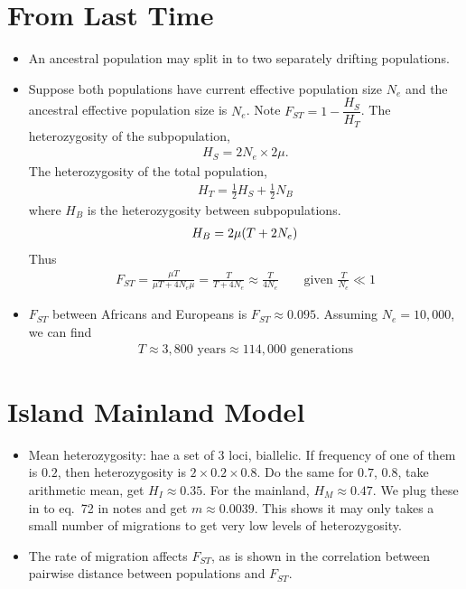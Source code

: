 \documentclass{article}
\begin{document}
    \section{From Last Time}
        \begin{itemize}
            \item An ancestral population may split in to two separately drifting populations.
            \item Suppose both populations have current effective population size $N_e$ and the ancestral effective population size is $N_e$.  Note $F_{ST} = 1 - \dfrac{H_S}{H_T}$.  The heterozygosity of the subpopulation,
            \begin{align}
                H_S = 2N_e\times2\mu.
            \end{align}
            The heterozygosity of the total population,
            \begin{align}
                H_T = \frac{1}{2}H_S + \frac{1}{2}N_B
            \end{align}
            where $H_B$ is the heterozygosity between subpopulations.
            \begin{align}
                H_B = 2\mu\qty(T + 2N_e)
            \end{align}
            Thus
            \begin{align}
                F_{ST} = \frac{\mu T}{\mu T + 4N_e\mu} = \frac{T}{T + 4N_e}\approx \frac{T}{4N_e} \qquad \text{given }\frac{T}{N_e} \ll 1
            \end{align}
            \item $F_{ST}$ between Africans and Europeans is $F_{ST} \approx 0.095$.  Assuming $N_e = 10,000$, we can find
            \begin{align}
                T \approx 3,800 \text{ years} \approx 114,000 \text{ generations}
            \end{align}
        \end{itemize}

    \section{Island Mainland Model}
        \begin{itemize}
            \item Mean heterozygosity: hae a set of 3 loci, biallelic.  If frequency of one of them is $0.2$, then heterozygosity is $2\times0.2\times0.8$.  Do the same for $0.7$, $0.8$, take arithmetic mean, get $H_I \approx 0.35$.  For the mainland, $H_M \approx 0.47$.  We plug these in to eq.~72 in notes and get $m\approx 0.0039$.  This shows it may only takes a small number of migrations to get very low levels of heterozygosity.
            \item The rate of migration affects $F_{ST}$, as is shown in the correlation between pairwise distance between populations and $F_{ST}$.
        \end{itemize}
\end{document}
